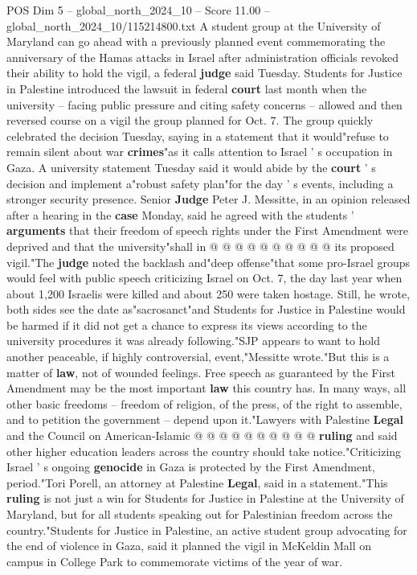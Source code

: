 \begin{textsample}{POS Dim 5 – global\_north\_2024\_10 – Score 11.00 – global\_north\_2024\_10/115214800.txt}  \label{ex:f5_pos_407}
A student group at the University of Maryland can go ahead with a previously planned event commemorating the anniversary of the Hamas attacks in Israel after administration officials revoked their ability to hold the vigil, a federal \textbf{judge} said Tuesday.
Students for Justice in Palestine introduced the lawsuit in federal \textbf{court} last month when the university -- facing public pressure and citing safety concerns -- allowed and then reversed course on a vigil the group planned for Oct. 7.
The group quickly celebrated the decision Tuesday, saying in a statement that it would"refuse to remain silent about war \textbf{crimes}"as it calls attention to Israel ' s occupation in Gaza.
A university statement Tuesday said it would abide by the \textbf{court} ' s decision and implement a"robust safety plan"for the day ' s events, including a stronger security presence.
Senior \textbf{Judge} Peter J.
Messitte, in an opinion released after a hearing in the \textbf{case} Monday, said he agreed with the students ' \textbf{arguments} that their freedom of speech rights under the First Amendment were deprived and that the university"shall in @ @ @ @ @ @ @ @ @ @ its proposed vigil."The \textbf{judge} noted the backlash and"deep offense"that some pro-Israel groups would feel with public speech criticizing Israel on Oct. 7, the day last year when about 1,200 Israelis were killed and about 250 were taken hostage.
Still, he wrote, both sides see the date as"sacrosanct"and Students for Justice in Palestine would be harmed if it did not get a chance to express its views according to the university procedures it was already following."SJP appears to want to hold another peaceable, if highly controversial, event,"Messitte wrote."But this is a matter of \textbf{law}, not of wounded feelings.
Free speech as guaranteed by the First Amendment may be the most important \textbf{law} this country has.
In many ways, all other basic freedoms -- freedom of religion, of the press, of the right to assemble, and to petition the government -- depend upon it."Lawyers with Palestine \textbf{Legal} and the Council on American-Islamic @ @ @ @ @ @ @ @ @ @ \textbf{ruling} and said other higher education leaders across the country should take notice."Criticizing Israel ' s ongoing \textbf{genocide} in Gaza is protected by the First Amendment, period."Tori Porell, an attorney at Palestine \textbf{Legal}, said in a statement."This \textbf{ruling} is not just a win for Students for Justice in Palestine at the University of Maryland, but for all students speaking out for Palestinian freedom across the country."Students for Justice in Palestine, an active student group advocating for the end of violence in Gaza, said it planned the vigil in McKeldin Mall on campus in College Park to commemorate victims of the year of war.

\end{textsample}

